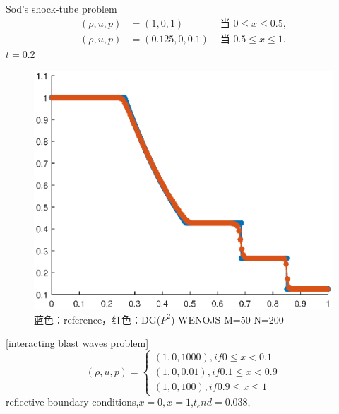 \documentclass{book}
\begin{document}
\begin{example}{Sod's shock-tube problem\cite{RN204}}{}
    \begin{equation}
        \begin{aligned}
            (\rho, u, p) & =(1,0,1)       & \text { 当 }0\leqslant x \leq 0.5,      \\
            (\rho, u, p) & =(0.125,0,0.1) & \text { 当 }0.5\leqslant x\leqslant 1 .
        \end{aligned}
    \end{equation}
    $t=0.2$

    \begin{figure}[H]
        \centering
        \label{fig:}
        \includegraphics[width=0.7\linewidth]{fig/sod.eps}
        \caption{蓝色：reference，红色：DG($P^2$)-WENOJS-M=50-N=200}
    \end{figure}
\end{example}
\begin{example}{}{}

    [interacting blast waves problem\cite{RN204}]
    \begin{equation}
        (\rho,u,p)=
        \begin{cases}
            (1,0,1000), if 0\leqslant x<0.1      \\
            (1,0,0.01), if 0.1 \leqslant x < 0.9 \\
            (1,0,100),if 0.9\leqslant x \leqslant 1
        \end{cases}
    \end{equation}
    reflective boundary conditions,$x=0,x=1$,$t_end=0.038$,
\end{example}
\end{document}
